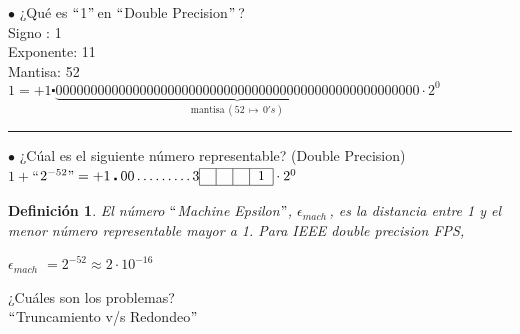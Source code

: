\begin{center}
$\bullet$ ¿Qué es $``$1$"$\,en $``$Double Precision$"$\,? \\
\vspace{1mm}
Signo : 1\\
Exponente: 11\\
Mantisa: 52\\
\vspace{5mm}
$1 = + 1 \centerdot \underbrace{ 0000000000000000000000000000000000000000000000000000}_{{\text{mantisa}}\,(52\,\longmapsto\,0's)} \cdot 2^{0}$\\

\vspace{3mm}
\begin{center}
\rule{15cm}{0.1mm}
\end{center}
\vspace{3mm}

$\bullet$ ¿Cúal es el siguiente número representable? (Double Precision)\\
\vspace{5mm}
$1 + $``$2^{-52}" = +1\centerdot 00\ldots \ldots \ldots3 \begin{tabular}{|c|c|c|c|}
\hline 
 &  &  & 1 \\ 
\hline 
\end{tabular} \cdot 2^0$
\end{center}

\newtheorem*{mydef}{Definición}
\begin{mydef}
El número $``$Machine Epsilon$"$, $\epsilon_{mach}$\,, es la distancia entre 1 y el menor número representable mayor a 1. Para IEEE double precision FPS, \begin{center}
$\epsilon_{mach}$ $= 2^{-52} \approx 2\cdot 10^{-16}$
\end{center}
\end{mydef}

\begin{center}
¿Cuáles son los problemas?\\
\vspace{5mm}
$``$Truncamiento v/s Redondeo$"$
\end{center}


